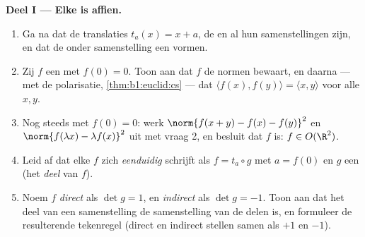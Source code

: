 \begin{problem}
\medskip
\noindent\textbf{Deel I --- Elke  is affien.}
\begin{enumerate}
  \item Ga na dat de translaties $t_a(x) = x + a$, de 
         en al hun samenstellingen  zijn, en
        dat de  onder samenstelling een  vormen.
  \item Zij $f$ een  met $f(0) = 0$. Toon aan dat $f$ de
        normen bewaart, en daarna --- met de polarisatie,
        \cref{thm:b1:euclid:cs} --- dat $\langle f(x), f(y)\rangle
        = \langle x, y\rangle$ voor alle $x, y$.
  \item Nog steeds met $f(0) = 0$: werk $\norm{f(x + y) - f(x) -
        f(y)}^2$ en $\norm{f(\lambda x) - \lambda f(x)}^2$ uit met
        vraag 2, en besluit dat $f$ \emph{} is: $f \in
        O(\R^2)$.
  \item Leid af dat elke  $f$ zich \emph{eenduidig}
        schrijft als $f = t_a \circ g$ met $a = f(0)$ en $g$ een
          (het \emph{ deel} van $f$).
  \item Noem $f$ \emph{direct} als $\det g = 1$, en \emph{indirect}
        als $\det g = -1$. Toon aan dat het  deel van een
        samenstelling de samenstelling van de  delen is, en
        formuleer de resulterende tekenregel (direct en indirect
        stellen samen als $+1$ en $-1$).
\end{enumerate}


\end{problem}
